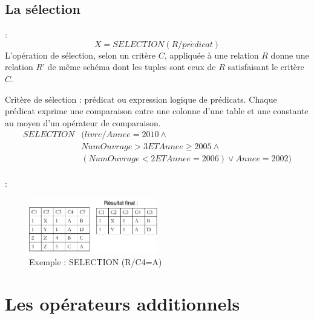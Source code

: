 \documentclass[10pt]{beamer}
\begin{document}
\subsection{La sélection}
\begin{frame}{\secname : \subsecname}
    $$
        X = SELECTION(R / pr\acute{e}dicat)
    $$
    L’opération de sélection, selon un critère $C$, appliquée à une relation $R$ donne une relation $R’$ de même schéma dont les tuples sont ceux de $R$ satisfaisant le critère $C$.

    Critère de sélection : prédicat ou expression logique de prédicats. Chaque prédicat exprime une comparaison entre une colonne d’une table et une constante au moyen d’un opérateur de comparaison.
    \begin{equation}
        \begin{split}
            SELECTION & (livre / Annee = 2010 \land \\
            & NumOuvrage > 3 ET Annee \geq 2005 \land \\
            & (NumOuvrage < 2 ET Annee = 2006) \lor Annee = 2002) \\
        \end{split}
    \end{equation}
\end{frame}

\begin{frame}{\secname : \subsecname}
    \begin{figure}
        \begin{center}
            \includegraphics[width=0.5\textwidth]{../assets/img/selection.pdf}
            \caption*{Exemple : SELECTION (R/C4=A)}
            \label{Fig:selection}
        \end{center}
    \end{figure}
\end{frame}

\section{Les opérateurs additionnels}
\end{document}
